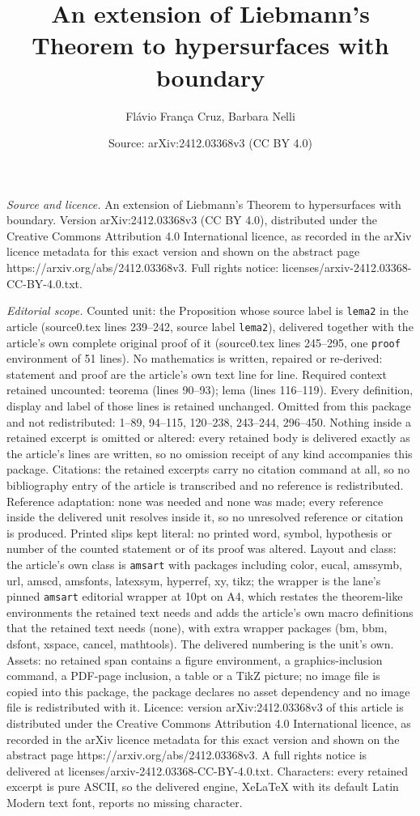 \documentclass[10pt,a4paper]{amsart}
\title[An extension of Liebmann's Theorem to hypersurfaces with bou]{An extension of Liebmann's Theorem to hypersurfaces with boundary}
\author{Fl\'avio Fran\c{c}a Cruz, Barbara Nelli}
\date{Source: arXiv:2412.03368v3 (CC BY 4.0)}
\begin{document}
\maketitle

\noindent\emph{Source and licence.} An extension of Liebmann's Theorem to hypersurfaces with boundary. Version arXiv:2412.03368v3 (CC BY 4.0), distributed under the Creative Commons Attribution 4.0 International licence, as recorded in the arXiv licence metadata for this exact version and shown on the abstract page https://arxiv.org/abs/2412.03368v3. Full rights notice: licenses/arxiv-2412.03368-CC-BY-4.0.txt.\par\smallskip

\noindent\textit{Editorial scope.} Counted unit: the Proposition whose source label is \texttt{lema2} in the article (source0.tex lines 239--242, source label \texttt{lema2}), delivered together with the article's own complete original proof of it (source0.tex lines 245--295, one \texttt{proof} environment of 51 lines). No mathematics is written, repaired or re-derived: statement and proof are the article's own text line for line. Required context retained uncounted: teorema (lines 90--93); lema (lines 116--119). Every definition, display and label of those lines is retained unchanged. Omitted from this package and not redistributed: 1--89, 94--115, 120--238, 243--244, 296--450. Nothing inside a retained excerpt is omitted or altered: every retained body is delivered exactly as the article's lines are written, so no omission receipt of any kind accompanies this package. Citations: the retained excerpts carry no citation command at all, so no bibliography entry of the article is transcribed and no reference is redistributed. Reference adaptation: none was needed and none was made; every reference inside the delivered unit resolves inside it, so no unresolved reference or citation is produced. Printed slips kept literal: no printed word, symbol, hypothesis or number of the counted statement or of its proof was altered. Layout and class: the article's own class is \texttt{amsart} with packages including color, eucal, amssymb, url, amscd, amsfonts, latexsym, hyperref, xy, tikz; the wrapper is the lane's pinned \texttt{amsart} editorial wrapper at 10pt on A4, which restates the theorem-like environments the retained text needs and adds the article's own macro definitions that the retained text needs (none), with extra wrapper packages (bm, bbm, dsfont, xspace, cancel, mathtools). The delivered numbering is the unit's own. Assets: no retained span contains a figure environment, a graphics-inclusion command, a PDF-page inclusion, a table or a TikZ picture; no image file is copied into this package, the package declares no asset dependency and no image file is redistributed with it. Licence: version arXiv:2412.03368v3 of this article is distributed under the Creative Commons Attribution 4.0 International licence, as recorded in the arXiv licence metadata for this exact version and shown on the abstract page https://arxiv.org/abs/2412.03368v3. A full rights notice is delivered at licenses/arxiv-2412.03368-CC-BY-4.0.txt. Characters: every retained excerpt is pure ASCII, so the delivered engine, XeLaTeX with its default Latin Modern text font, reports no missing character.
\end{document}
